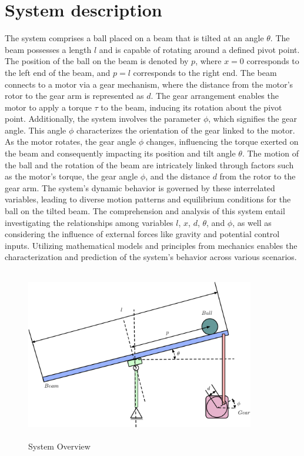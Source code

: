 \documentclass{article}
\begin{document}
\section{System description}
The system comprises a ball placed on a beam that is tilted at an angle $\theta$.
The beam possesses a length $l$ and is capable of rotating around a defined pivot point.
The position of the ball on the beam is denoted by $p$, where $x = 0$ corresponds to the left end of the beam,
and $p = l$ corresponds to the right end.
The beam connects to a motor via a gear mechanism, where the distance from the motor's rotor to the gear arm is represented as $d$. The gear arrangement enables the motor to apply a torque $\tau$ to the beam, inducing its rotation about the pivot point.
Additionally, the system involves the parameter $\phi$, which signifies the gear angle.
This angle $\phi$ characterizes the orientation of the gear linked to the motor. As the motor rotates,
the gear angle $\phi$ changes, influencing the torque exerted on the beam and consequently impacting its position and tilt angle $\theta$.
The motion of the ball and the rotation of the beam are intricately linked through factors such as the motor's torque,
the gear angle $\phi$, and the distance $d$ from the rotor to the gear arm.
The system's dynamic behavior is governed by these interrelated variables,
leading to diverse motion patterns and equilibrium conditions for the ball on the tilted beam.
The comprehension and analysis of this system entail investigating the relationships among variables $l$, $x$, $d$, $\theta$, and $\phi$, as well as considering the influence of external forces like gravity and potential control inputs.
Utilizing mathematical models and principles from mechanics enables the characterization and prediction of the system's behavior across various scenarios.
\begin{figure}[h]
	\centering
	\includegraphics[height =7.5cm,width =10cm]{System_Overview}
	\caption{System Overview}
\end{figure}
\newpage
\end{document}
